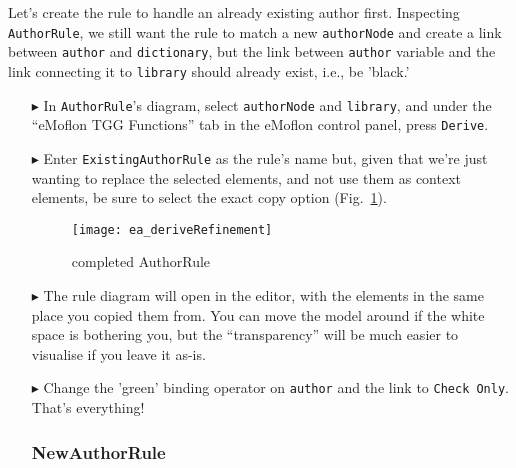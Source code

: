 Let's create the rule to handle an already existing author first. Inspecting \texttt{AuthorRule}, we still want the rule to match a new \texttt{authorNode}
and create a link between \texttt{author} and \texttt{dictionary}, but the link between \texttt{author} variable and the link connecting it to \texttt{library}
should already exist, i.e., be 'black.'

\begin{itemize}

\subsubsection{ExistingAuthorRule} %

\item[$\blacktriangleright$] In \texttt{AuthorRule}'s diagram, select \texttt{authorNode} and \texttt{library}, and under the ``eMoflon TGG Functions'' tab in
the eMoflon control panel, press \texttt{Derive}. 

\item[$\blacktriangleright$] Enter \texttt{ExistingAuthorRule} as the rule's name but, given that we're just wanting to replace the selected elements, and not
use them as context elements, be sure to select the exact copy option (Fig.~\ref{ea:deriveRefinement}).

\begin{figure}[htbp]
\begin{center}
  \texttt{[image: ea\_deriveRefinement]}
  \caption{completed AuthorRule}
  \label{ea:deriveRefinement}
\end{center}
\end{figure}

\item[$\blacktriangleright$] The rule diagram will open in the editor, with the elements in the same place you copied them from. You can move the model around
if the white space is bothering you, but the ``transparency'' will  be much easier to visualise if you leave it as-is.

\item[$\blacktriangleright$] Change the 'green' binding operator on \texttt{author} and the link to \texttt{Check Only}. That's everything!

\subsubsection{NewAuthorRule} %


\end{itemize}

